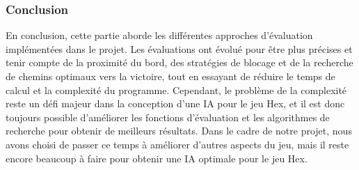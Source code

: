 \subsubsection{Conclusion}
En conclusion, cette partie aborde les différentes approches d'évaluation implémentées dans le projet.
Les évaluations ont évolué pour être plus précises et tenir compte de la proximité du bord, des stratégies de blocage
et de la recherche de chemins optimaux vers la victoire, tout en essayant de réduire le temps de calcul et la complexité
du programme.
Cependant, le problème de la complexité reste un défi majeur dans la conception d'une IA pour le jeu Hex, et il est donc
toujours possible d'améliorer les fonctions d'évaluation et les algorithmes de recherche pour obtenir de meilleurs résultats.
Dans le cadre de notre projet, nous avons choisi de passer ce temps à améliorer d'autres aspects du jeu,
mais il reste encore beaucoup à faire pour obtenir une IA optimale pour le jeu Hex.

